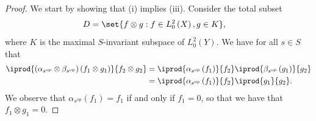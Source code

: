 \documentclass[10pt]{mypackage}
\begin{document}
\begin{proof}
  We start by showing that (i) implies (iii). Consider the total subset
  \begin{align*}
    D &= \set{f\otimes g : f\in L^2_0\left( X \right),g\in K},
  \end{align*}
  where $K$ is the maximal $S$-invariant subspace of $L^2_0\left( Y \right)$. We have for all $s\in S$ that
  \begin{align*}
    \iprod{\left( \alpha_{s^{\operatorname{op}}}\otimes \beta_{s^{\operatorname{op}}} \right)\left( f_1\otimes g_1 \right)}{f_2\otimes g_2} &= \iprod{\alpha_{s^{\operatorname{op}}}\left( f_1 \right)}{f_2} \iprod{\beta_{s^{\operatorname{op}}}\left( g_1 \right)}{g_2}\\
                                              &= \iprod{\alpha_{s^{\operatorname{op}}}\left( f_1 \right)}{f_2} \iprod{g_1}{g_2}.
  \end{align*}
  We observe that $\alpha_{s^{\operatorname{op}}}\left( f_1 \right) = f_1$ if and only if $f_1 = 0$, so that we have that $f_1\otimes g_1 = 0$.


\end{proof}
\end{document}
